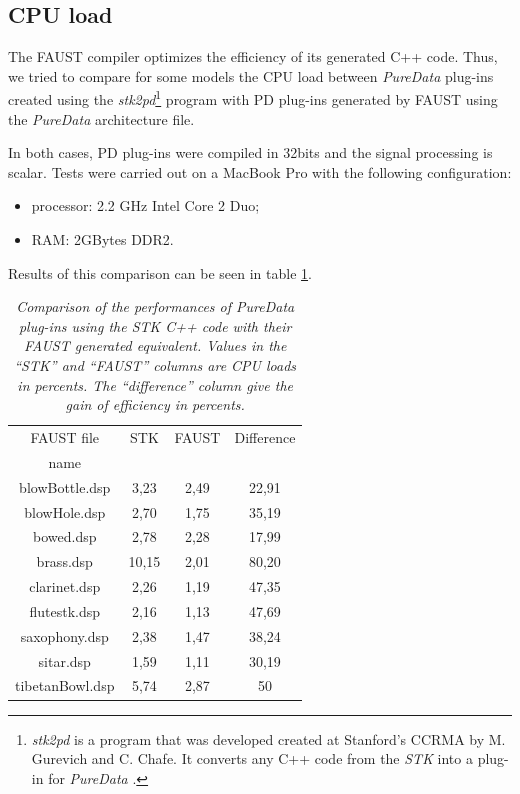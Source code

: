 \documentclass[twoside,a4paper]{article}
\begin{document}
\subsection{CPU load}

The FAUST compiler optimizes the efficiency of its generated C++
code. Thus, we tried to compare for some models the CPU load between
{\it PureData} plug-ins created using the {\it stk2pd}\footnote{{\it
    stk2pd} is a program that was developed created at Stanford's
  CCRMA by M. Gurevich and C. Chafe. It converts any C++ code from the {\it
  STK} into a plug-in for {\it PureData} \cite{stk2pd}.} program with
PD plug-ins generated by FAUST using the {\it PureData} architecture
file.

In both cases, PD plug-ins were compiled in 32bits and the signal
processing is scalar. Tests were carried out on a MacBook Pro with the
following configuration:
\begin{itemize}
\item processor: 2.2 GHz Intel Core 2 Duo;
\item RAM: 2GBytes DDR2.  
\end{itemize}

Results of this comparison can be seen in table \ref{tab:computationalTest}.

\begin{table}[ht]
\begin{center}
\begin{tabular}{c c c c}
\hline
\hline
FAUST file & STK & FAUST & Difference \\
name &  \\
\hline
blowBottle.dsp  & 3,23 & 2,49 & 22,91 \\
blowHole.dsp & 2,70 & 1,75 &  35,19\\
bowed.dsp &  2,78 & 2,28 & 17,99 \\
brass.dsp & 10,15 & 2,01 & 80,20 \\
clarinet.dsp & 2,26 & 1,19 & 47,35 \\
flutestk.dsp & 2,16 & 1,13 & 47,69 \\
saxophony.dsp & 2,38 & 1,47 & 38,24 \\
sitar.dsp & 1,59 & 1,11 & 30,19 \\
tibetanBowl.dsp & 5,74 & 2,87 & 50 \\
\hline
\end{tabular}
\end{center}
\caption{{\it Comparison of the performances of PureData plug-ins
    using the STK C++ code with their FAUST generated equivalent. Values
  in the ``STK'' and ``FAUST'' columns are CPU loads in percents. The
  ``difference'' column give the gain of efficiency in percents.}} 
\label{tab:computationalTest}
\end{table}
\end{document}
